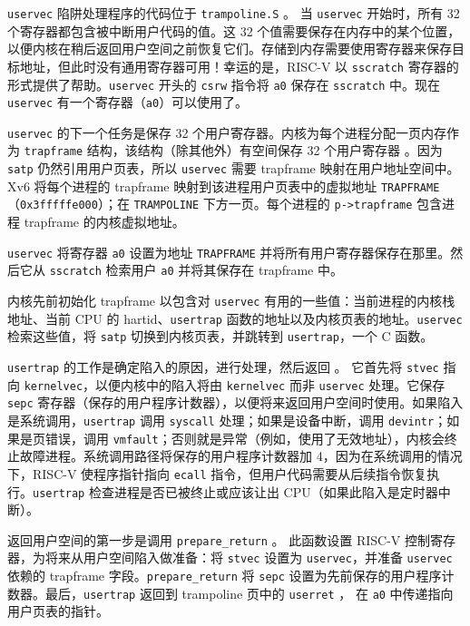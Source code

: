 {\tt uservec} 陷阱处理程序的代码位于 {\tt trampoline.S}
。
当 {\tt uservec} 开始时，所有 32 个寄存器都包含被中断用户代码的值。这 32 个值需要保存在内存中的某个位置，以便内核在稍后返回用户空间之前恢复它们。存储到内存需要使用寄存器来保存目标地址，但此时没有通用寄存器可用！幸运的是，RISC-V 以 {\tt sscratch} 寄存器的形式提供了帮助。{\tt uservec} 开头的 {\tt csrw} 指令将 {\tt a0} 保存在 {\tt sscratch} 中。现在 {\tt uservec} 有一个寄存器（{\tt a0}）可以使用了。

{\tt uservec} 的下一个任务是保存 32 个用户寄存器。内核为每个进程分配一页内存作为 {\tt trapframe} 结构，该结构（除其他外）有空间保存 32 个用户寄存器
。因为 {\tt satp} 仍然引用用户页表，所以 {\tt uservec} 需要 trapframe 映射在用户地址空间中。Xv6 将每个进程的 trapframe 映射到该进程用户页表中的虚拟地址 {\tt TRAPFRAME}（{\tt 0x3fffffe000}）；在 {\tt TRAMPOLINE} 下方一页。每个进程的 {\tt p->trapframe}
包含进程 trapframe 的内核虚拟地址。

{\tt uservec} 将寄存器 {\tt a0} 设置为地址 {\tt TRAPFRAME} 并将所有用户寄存器保存在那里。然后它从 {\tt sscratch} 检索用户 {\tt a0} 并将其保存在 trapframe 中。

内核先前初始化 trapframe 以包含对 {\tt uservec} 有用的一些值：当前进程的内核栈地址、当前 CPU 的 hartid、{\tt usertrap} 函数的地址以及内核页表的地址。{\tt uservec} 检索这些值，将 {\tt satp} 切换到内核页表，并跳转到 {\tt usertrap}，一个 C 函数。

{\tt usertrap} 的工作是确定陷入的原因，进行处理，然后返回
。
它首先将 {\tt stvec} 指向 {\tt kernelvec}，以便内核中的陷入将由 {\tt kernelvec} 而非 {\tt uservec} 处理。它保存 {\tt sepc} 寄存器（保存的用户程序计数器），以便将来返回用户空间时使用。如果陷入是系统调用，{\tt usertrap} 调用 {\tt syscall} 处理；如果是设备中断，调用 {\tt devintr}；如果是页错误，调用 {\tt vmfault}；否则就是异常（例如，使用了无效地址），内核会终止故障进程。系统调用路径将保存的用户程序计数器加 4，因为在系统调用的情况下，RISC-V 使程序指针指向 {\tt ecall} 指令，但用户代码需要从后续指令恢复执行。{\tt usertrap} 检查进程是否已被终止或应该让出 CPU（如果此陷入是定时器中断）。

返回用户空间的第一步是调用 {\tt prepare\_return}
{}。
此函数设置 RISC-V 控制寄存器，为将来从用户空间陷入做准备：将 {\tt stvec}
设置为 {\tt uservec}，并准备 {\tt uservec} 依赖的 trapframe 字段。{\tt prepare\_return} 将 {\tt sepc} 设置为先前保存的用户程序计数器。最后，{\tt usertrap}
返回到 trampoline 页中的 {\tt userret}
，
在 {\tt a0} 中传递指向用户页表的指针。

